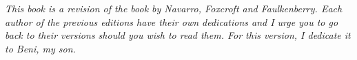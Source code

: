 

\newpage

\vspace*{7cm}
\begin{center}
{\it \large
This book is a revision of the book by Navarro, Foxcroft and Faulkenberry. Each author of the previous editions have their own dedications and I urge you to go back to their versions should you wish to read them.
\newline
For this version, I dedicate it to Beni, my son.
}
\end{center}


